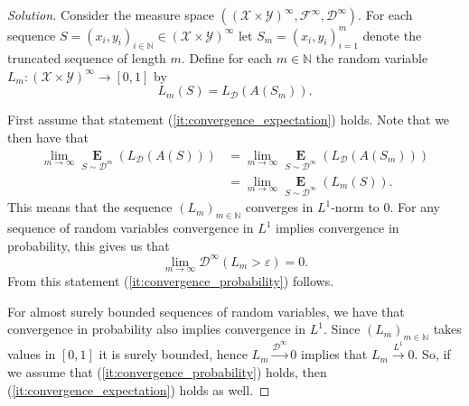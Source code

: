 \documentclass[10pt, a4paper, twoside]{amsart}
\newcommand{\N}{\ensuremath{\mathbb{N}}}
\newcommand{\Ev}{\operatorname*{\ensuremath{\mathbf{E}}}} %
\newcommand{\Fa}{\ensuremath{\mathcal{F}}} %
\newenvironment{solution}
               {\let\oldqedsymbol=\qedsymbol
                \renewcommand{\qedsymbol}{$\blacktriangleleft$}
                \begin{proof}[Solution]}
               {\end{proof}
                \renewcommand{\qedsymbol}{\oldqedsymbol}}
\begin{document}
\begin{solution}
Consider the measure space $((\mathcal{X}\times\mathcal{Y})^\infty, \Fa^{\infty}, \mathcal{D}^\infty)$.
For each sequence $S=(x_i,y_i)_{i \in \N} \in (\mathcal{X}\times\mathcal{Y})^\infty$
let $S_m=(x_i,y_i)_{i=1}^{m}$ denote the truncated sequence of length $m$.
Define for each $m \in \N$ the random variable $L_m:(\mathcal{X}\times\mathcal{Y})^\infty \to [0,1]$ by
\begin{equation*}
 L_m(S)=L_{\mathcal{D}}(A(S_m)).
\end{equation*}

First assume that statement (\ref{it:convergence_expectation}) holds. 
Note that we then have that 
\begin{align*}
 \lim_{m\to \infty}\Ev_{S\sim \mathcal{D}^{m}}(L_{\mathcal{D}}(A(S))) &= 
 \lim_{m\to \infty}\Ev_{S\sim \mathcal{D}^{\infty}}(L_{\mathcal{D}}(A(S_m))) \\
 & = \lim_{m\to \infty}\Ev_{S\sim \mathcal{D}^{\infty}}(L_m(S)).
\end{align*}
This means that the sequence $(L_m)_{m \in \N}$ converges in $L^1$-norm to $0$.
For any sequence of random variables convergence in $L^1$ implies convergence in probability, this gives us that
\begin{equation*}
 \lim_{m\to \infty}\mathcal{D}^{\infty}(L_m>\varepsilon)=0.
\end{equation*}
From this statement (\ref{it:convergence_probability}) follows.

For almost surely bounded sequences of random variables, we have that convergence in probability also implies convergence in 
$L^1$. Since $(L_m)_{m\in \N}$ takes values in $[0,1]$ it is surely bounded, hence $L_m \stackrel{\mathcal{D}^{\infty}}{\to} 0$ implies that $L_m \stackrel{L^1}{\to} 0$. So, if we assume that (\ref{it:convergence_probability}) holds, then (\ref{it:convergence_expectation}) holds as well.
\end{solution}
\end{document}
